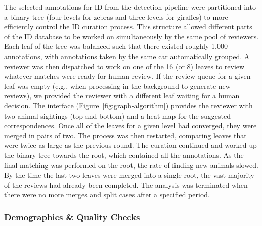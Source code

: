 The selected annotations for ID from the detection pipeline were partitioned into a binary tree (four levels for zebras and three levels for giraffes) to more efficiently control the ID curation process.  This structure allowed different parts of the ID database to be worked on simultaneously by the same pool of reviewers.  Each leaf of the tree was balanced such that there existed roughly 1,000 annotations, with annotations taken by the same car automatically grouped.  A reviewer was then dispatched to work on one of the 16 (or 8) leaves to review whatever matches were ready for human review.  If the review queue for a given leaf was empty (e.g., when processing in the background to generate new reviews), we provided the reviewer with a different leaf waiting for a human decision.  The interface (Figure~\ref{fig:graph-algorithm}) provides the reviewer with two animal sightings (top and bottom) and a heat-map for the suggested correspondences.  Once all of the leaves for a given level had converged, they were merged in pairs of two.  The process was then restarted, comparing leaves that were twice as large as the previous round.  The curation continued and worked up the binary tree towards the root, which contained all the annotations.  As the final matching was performed on the root, the rate of finding new animals slowed.  By the time the last two leaves were merged into a single root, the vast majority of the reviews had already been completed.  The analysis was terminated when there were no more merges and split cases after a specified period.

\subsubsection{Demographics \& Quality Checks} \label{sec:demographics}


